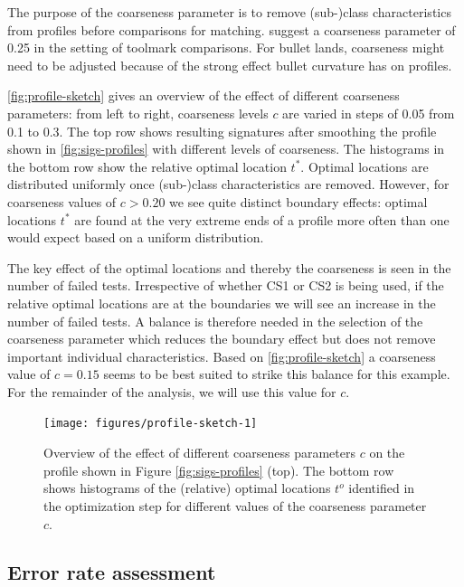 \documentclass[12pt]{article}
\begin{document}
The purpose of the coarseness parameter is to remove (sub-)class
characteristics from profiles before comparisons for matching.
\citet{hadler} suggest a coarseness parameter of 0.25 in the setting of
toolmark comparisons. For bullet lands, coarseness might need to be
adjusted because of the strong effect bullet curvature has on profiles.

\autoref{fig:profile-sketch} gives an overview of the effect of
different coarseness parameters: from left to right, coarseness levels
\(c\) are varied in steps of 0.05 from 0.1 to 0.3. The top row shows
resulting signatures after smoothing the profile shown in
\autoref{fig:sigs-profiles} with different levels of coarseness. The
histograms in the bottom row show the relative optimal location \(t^*\).
Optimal locations are distributed uniformly once (sub-)class
characteristics are removed. However, for coarseness values of
\(c > 0.20\) we see quite distinct boundary effects: optimal locations
\(t^*\) are found at the very extreme ends of a profile more often than
one would expect based on a uniform distribution.

The key effect of the optimal locations and thereby the coarseness is
seen in the number of failed tests. Irrespective of whether CS1 or CS2
is being used, if the relative optimal locations are at the boundaries
we will see an increase in the number of failed tests. A balance is
therefore needed in the selection of the coarseness parameter which
reduces the boundary effect but does not remove important individual
characteristics. Based on \autoref{fig:profile-sketch} a coarseness
value of \(c = 0.15\) seems to be best suited to strike this balance for
this example. For the remainder of the analysis, we will use this value
for \(c\).

\begin{figure}

{\centering \texttt{[image: figures/profile-sketch-1]} 

}

\caption{Overview of the effect of different coarseness parameters $c$ on the profile shown in Figure \ref{fig:sigs-profiles} (top). The bottom row shows histograms of  the (relative) optimal locations $t^o$ identified in the optimization step for different values of the coarseness parameter $c$. }\label{fig:profile-sketch}
\end{figure}

\hypertarget{error-rate-assessment}{%
\subsection{Error rate assessment}\label{error-rate-assessment}}
\end{document}
